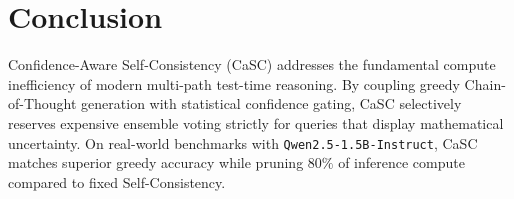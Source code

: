 \documentclass[11pt,a4paper]{article}
\begin{document}
\section{Conclusion}
Confidence-Aware Self-Consistency (CaSC) addresses the fundamental compute inefficiency of modern multi-path test-time reasoning. By coupling greedy Chain-of-Thought generation with statistical confidence gating, CaSC selectively reserves expensive ensemble voting strictly for queries that display mathematical uncertainty. On real-world benchmarks with \texttt{Qwen2.5-1.5B-Instruct}, CaSC matches superior greedy accuracy while pruning $80\%$ of inference compute compared to fixed Self-Consistency.
\end{document}
